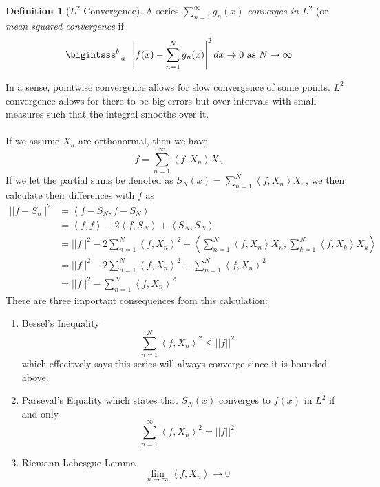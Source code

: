 \documentclass{article}
\newcommand{\ip}[2]{\left\langle #1,#2\right\rangle}
\newcommand{\push}{\,\,\,}
\theoremstyle{definition}
\newtheorem{definition}[theorem]{Definition}
\begin{document}
\begin{definition}[$L^2$ Convergence]
    A series $\displaystyle{\sum^\infty_{n=1}g_n(x)}$ \emph{converges in $L^2$} (or \emph{mean squared convergence} if 
    \begin{equation*}
        \bigintsss
        ^b_{\push\push\!\!a}\push\left|f(x)-\sum^N_{n=1}g_n(x)\right|^2dx \to 0 \text{ as } N\to \infty
    \end{equation*}
\end{definition}
In a sense, pointwise convergence allows for slow convergence of some points. $L^2$ convergence allows for there to be big errors but over intervals with small measures such that the integral smooths over it.\\\\
If we assume $X_n$ are orthonormal, then we have 
\begin{equation*}
    f = \sum^\infty_{n=1}\ip{f}{X_n}X_n
\end{equation*}
If we let the partial sums be denoted as $S_N(x)=\displaystyle{\sum^N_{n=1}\ip{f}{X_n}{X_n}}$, we then calculate their differences with $f$ as 
\begin{equation*}
    \begin{split}
        ||f-S_n||^2 &= \ip{f-S_N}{f-S_N} \\
        &= \ip{f}{f}-2\ip{f}{S_N}+\ip{S_N}{S_N} \\
        &= ||f||^2-2\sum^N_{n=1}\ip{f}{X_n}^2 + \ip{\sum^N_{n=1}\ip{f}{X_n}X_n}{\sum^N_{k=1}\ip{f}{X_k}X_k} \\
        &= ||f||^2-2\sum^N_{n=1} \ip{f}{X_n}^2+\sum^N_{n=1}\ip{f}{X_n}^2 \\
        &=||f||^2-\sum^N_{n=1}\ip{f}{X_n}^2
    \end{split}
\end{equation*}
There are three important consequences from this calculation:
\begin{enumerate}
    \item Bessel's Inequality
    \begin{equation*}
        \sum^N_{n=1} \ip{f}{X_n}^2 \leq ||f||^2
    \end{equation*}
    which effecitvely says this series will always converge since it is bounded above.
    \item Parseval's Equality which states that $S_N(x)$ converges to $f(x)$ in $L^2$ if and only 
    \begin{equation*}
        \sum^\infty_{n=1}\ip{f}{X_n}^2 = ||f||^2
    \end{equation*}
    \item Riemann-Lebesgue Lemma 
    \begin{equation*}
        \lim_{n\to \infty} \ip{f}{X_n} \to 0
    \end{equation*}
\end{enumerate}
\end{document}
